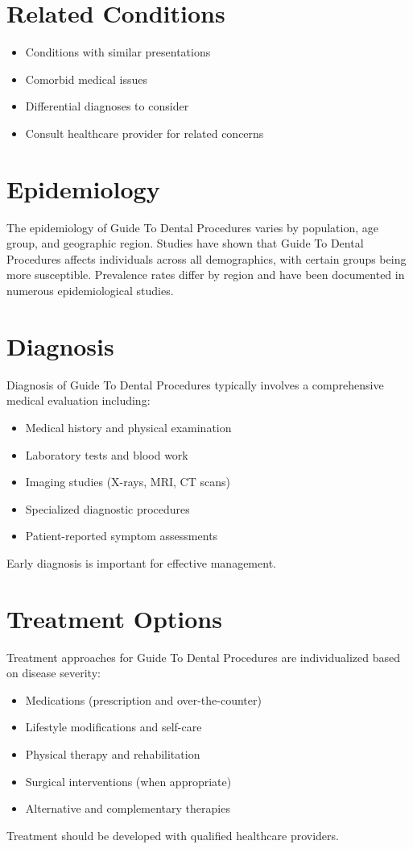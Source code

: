 \section*{Related Conditions}
\begin{itemize}
  \item Conditions with similar presentations
  \item Comorbid medical issues
  \item Differential diagnoses to consider
  \item Consult healthcare provider for related concerns
\end{itemize}

\section*{Epidemiology}
The epidemiology of Guide To Dental Procedures varies by population, age group, and geographic region. Studies have shown that Guide To Dental Procedures affects individuals across all demographics, with certain groups being more susceptible. Prevalence rates differ by region and have been documented in numerous epidemiological studies.

\section*{Diagnosis}
Diagnosis of Guide To Dental Procedures typically involves a comprehensive medical evaluation including:
\begin{itemize}
  \item Medical history and physical examination
  \item Laboratory tests and blood work
  \item Imaging studies (X-rays, MRI, CT scans)
  \item Specialized diagnostic procedures
  \item Patient-reported symptom assessments
\end{itemize}
Early diagnosis is important for effective management.

\section*{Treatment Options}
Treatment approaches for Guide To Dental Procedures are individualized based on disease severity:
\begin{itemize}
  \item Medications (prescription and over-the-counter)
  \item Lifestyle modifications and self-care
  \item Physical therapy and rehabilitation
  \item Surgical interventions (when appropriate)
  \item Alternative and complementary therapies
\end{itemize}
Treatment should be developed with qualified healthcare providers.

